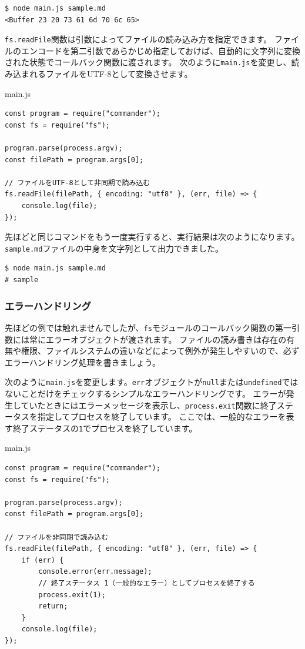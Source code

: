 \begin{lstlisting}
$ node main.js sample.md
<Buffer 23 20 73 61 6d 70 6c 65>
\end{lstlisting}

\texttt{fs.readFile}関数は引数によってファイルの読み込み方を指定できます。
ファイルのエンコードを第二引数であらかじめ指定しておけば、自動的に文字列に変換された状態でコールバック関数に渡されます。
次のように\texttt{main.js}を変更し、読み込まれるファイルをUTF-8として変換させます。

\begin{listtitle}
main.js
\end{listtitle}
\begin{lstlisting}
const program = require("commander");
const fs = require("fs");

program.parse(process.argv);
const filePath = program.args[0];

// ファイルをUTF-8として非同期で読み込む
fs.readFile(filePath, { encoding: "utf8" }, (err, file) => {
    console.log(file);
});
\end{lstlisting}
\listend

先ほどと同じコマンドをもう一度実行すると、実行結果は次のようになります。
\texttt{sample.md}ファイルの中身を文字列として出力できました。

\begin{lstlisting}
$ node main.js sample.md
# sample
\end{lstlisting}

\hypertarget{error-handling}{%
\subsubsection{エラーハンドリング}\label{error-handling}}

先ほどの例では触れませんでしたが、\texttt{fs}モジュールのコールバック関数の第一引数には常にエラーオブジェクトが渡されます。
ファイルの読み書きは存在の有無や権限、ファイルシステムの違いなどによって例外が発生しやすいので、必ずエラーハンドリング処理を書きましょう。

次のように\texttt{main.js}を変更します。\texttt{err}オブジェクトが\texttt{null}または\texttt{undefined}ではないことだけをチェックするシンプルなエラーハンドリングです。
エラーが発生していたときにはエラーメッセージを表示し、\texttt{process.exit}関数に終了ステータスを指定してプロセスを終了しています。
ここでは、一般的なエラーを表す終了ステータスの\texttt{1}でプロセスを終了しています。

\begin{listtitle}
main.js
\end{listtitle}
\begin{lstlisting}
const program = require("commander");
const fs = require("fs");

program.parse(process.argv);
const filePath = program.args[0];

// ファイルを非同期で読み込む
fs.readFile(filePath, { encoding: "utf8" }, (err, file) => {
    if (err) {
        console.error(err.message);
        // 終了ステータス 1（一般的なエラー）としてプロセスを終了する
        process.exit(1);
        return;
    }
    console.log(file);
});
\end{lstlisting}
\listend

